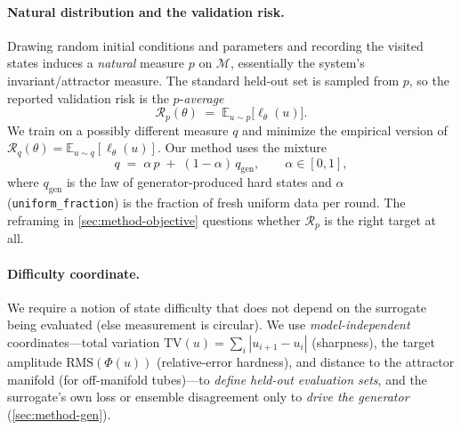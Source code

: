 \documentclass{article}
\theoremstyle{plain}
\theoremstyle{definition}
\theoremstyle{remark}
\newcommand{\E}{\mathbb{E}}
\newcommand{\state}{u}
\newcommand{\manifold}{\mathcal{M}}
\newcommand{\sol}{\Phi}
\newcommand{\lossf}{\ell_\theta}
\newcommand{\pnat}{p}
\newcommand{\qtr}{q}
\newcommand{\qgen}{q_{\mathrm{gen}}}
\newcommand{\Rp}{\mathcal{R}_{\pnat}}
\newcommand{\Rq}{\mathcal{R}_{\qtr}}
\newcommand{\unif}{\alpha}
\begin{document}
\paragraph{Natural distribution and the validation risk.}
Drawing random initial conditions and parameters and recording the visited states induces a
\emph{natural} measure $\pnat$ on $\manifold$, essentially the system's invariant/attractor measure. The
standard held-out set is sampled from $\pnat$, so the reported validation risk is the
$\pnat$-\emph{average}
\begin{equation}
  \Rp(\theta)\;=\;\E_{\state\sim\pnat}\!\bigl[\lossf(\state)\bigr].
  \label{eq:Rp}
\end{equation}
We train on a possibly different measure $\qtr$ and minimize the empirical version of
$\Rq(\theta)=\E_{\state\sim\qtr}[\lossf(\state)]$. Our method uses the mixture
\begin{equation}
  \qtr\;=\;\unif\,\pnat\;+\;(1-\unif)\,\qgen,\qquad \unif\in[0,1],
  \label{eq:mixture}
\end{equation}
where $\qgen$ is the law of generator-produced hard states and $\unif$ (\texttt{uniform\_fraction}) is
the fraction of fresh uniform data per round. The reframing in \cref{sec:method-objective} questions
whether $\Rp$ is the right target at all.

\paragraph{Difficulty coordinate.}
We require a notion of state difficulty that does not depend on the surrogate being evaluated (else
measurement is circular). We use \emph{model-independent} coordinates---total variation
$\mathrm{TV}(\state)=\sum_i|\state_{i+1}-\state_i|$ (sharpness), the target amplitude
$\mathrm{RMS}(\sol(\state))$ (relative-error hardness), and distance to the attractor manifold (for
off-manifold tubes)---to \emph{define held-out evaluation sets}, and the surrogate's own loss or ensemble
disagreement only to \emph{drive the generator} (\cref{sec:method-gen}).
\end{document}
